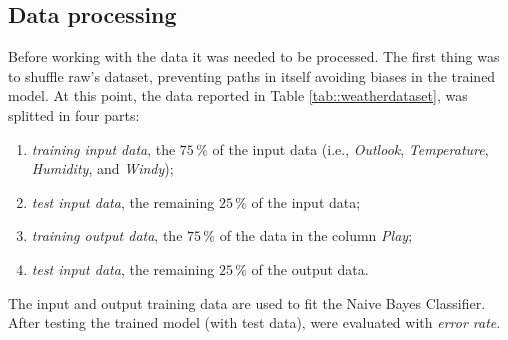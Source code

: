 \documentclass[9pt,technote]{IEEEtran}
\begin{document}
\subsection{Data processing}
Before working with the data it was needed to be processed. The first thing was to shuffle raw's dataset, preventing paths in itself avoiding biases in the trained model.
At this point, the data reported in Table \ref{tab::weatherdataset}, was splitted in four parts:
\begin{enumerate}
	\item \textit{training input data}, the $75\,\%$ of the input data (i.e., \textit{Outlook}, \textit{Temperature}, \textit{Humidity}, and \textit{Windy});
	\item \textit{test input data}, the remaining $25\,\%$ of the input data;
	\item \textit{training output data}, the $75\,\%$ of the data in the column \textit{Play};
	\item \textit{test input data}, the remaining $25\,\%$ of the output data.
\end{enumerate}
The input and output training data are used to fit the Naive Bayes Classifier. After testing the trained model (with test data), were evaluated with \textit{error rate}.
\end{document}

